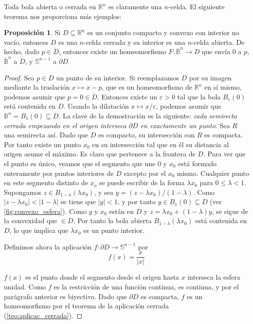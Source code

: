 \documentclass[10pt]{report}
\newcommand{\R}{\mathbb{R}}
\theoremstyle{definition}
\newtheorem{prop}[defin]{Proposición}
\begin{document}
Toda bola abierta o cerrada en $\R^n$ es claramente una $n$-celda. El siguiente teorema nos proporciona más ejemplos:

\begin{prop}%
\label{teo:convexo_homeom_esfera} 
Si $D\subseteq \R^n$ es un conjunto compacto y convexo con interior no vacío, entonces $D$ es una $n$-celda cerrada y su interior es una $n$-celda abierta. De hecho, dado $p\in \mathring{D}$, entonces existe un homeomorfismo $F:\overline{\mathbb{B}}^n\to D$ que envía $0$ a $p$, $\overline{\mathbb{B}}^n$ a $\mathring{D}$, y $\mathbb{S}^{n-1}$ a $\partial D$.
\end{prop}
\begin{proof}
Sea $p\in D$ un punto de su interior. Si reemplazamos $D$ por su imagen mediante la traslación $x\mapsto x-p$, que es un homeomorfismo de $\R^n$ en sí mismo, podemos asumir que $p=0\in \mathring{D}$. Entonces existe un $\varepsilon >0 $ tal que la bola $B_{\varepsilon}(0)$ está contenida en $D$. Usando la dilatación $x\mapsto x/\varepsilon$, podemos asumir que $\mathbb{B}^n = B_ 1(0) \subseteq D$.
La clave de la demostración es la siguiente: \emph{cada semirecta cerrada empezando en el origen interseca $\partial
D$ en exactamente un punto}. Sea $R$ una semirecta así. Dado que $D$ es compacto, su intersección con $R$ es compacta. Por tanto existe un punto $x_0$ en su intersección tal que en él su distancia al origen asume el máximo. Es claro %
que pertenece a la frontera de $D$. Para ver que el punto es único, veamos que el segmento que une $0$ y $x_0$ está formado enteramente por puntos interiores de $D$ excepto por el $x_0$ mismo. Cualquier punto en este segmento distinto de $x_o$ se puede escribir de la forma $\lambda x_0 $ para $0\leq \lambda <1. $ Supongamos $z\in B_{1-\lambda}(\lambda x_0)$, y sea $y=(z-\lambda x_0)/(1-\lambda )$. Como $|z-\lambda x_0|<|1-\lambda|$ se tiene que $|y|<1$, y por tanto $y\in B_ 1(0)\subseteq D$ (ver \autoref{fig:convexo_esfera}). Como $y$ y $x_0$ están en $D$ y $z=\lambda x_0 + (1-\lambda )y$, se sigue de la convexidad que $\in D$. Por tanto la bola abierta $B_{1-\lambda}(\lambda x_0)$ está contenida en $D$, lo que implica que $\lambda x_0$ es un punto interior.

Definimos ahora la aplicación $f:\partial D \to \mathbb{S}^{n-1}$ por 
$$f(x)=\frac{x}{|x|}$$

$f(x)$ es el punto donde el segmento desde el origen hasta $x$ interseca la esfera unidad. Como $f$ es la restricción de una función continua, es continua, y por el parágrafo anterior es biyectiva. Dado que $\partial D$ es compacta, $f$ es un homeomorfismo por el teorema de la aplicación cerrada (\autoref{teo:aplicac_cerrada}).


\end{proof}
\end{document}
